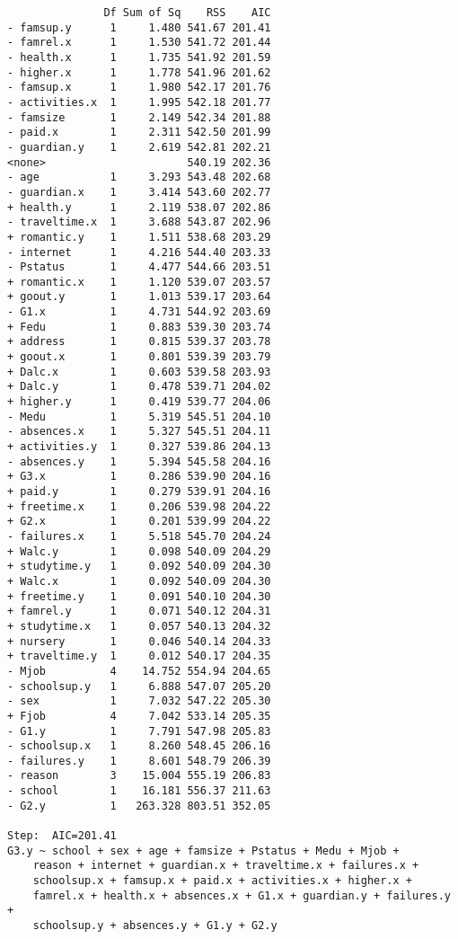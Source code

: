 \documentclass[11pt]{article}
\begin{document}
\begin{enumerate}
\begin{verbatim}
               Df Sum of Sq    RSS    AIC
- famsup.y      1     1.480 541.67 201.41
- famrel.x      1     1.530 541.72 201.44
- health.x      1     1.735 541.92 201.59
- higher.x      1     1.778 541.96 201.62
- famsup.x      1     1.980 542.17 201.76
- activities.x  1     1.995 542.18 201.77
- famsize       1     2.149 542.34 201.88
- paid.x        1     2.311 542.50 201.99
- guardian.y    1     2.619 542.81 202.21
<none>                      540.19 202.36
- age           1     3.293 543.48 202.68
- guardian.x    1     3.414 543.60 202.77
+ health.y      1     2.119 538.07 202.86
- traveltime.x  1     3.688 543.87 202.96
+ romantic.y    1     1.511 538.68 203.29
- internet      1     4.216 544.40 203.33
- Pstatus       1     4.477 544.66 203.51
+ romantic.x    1     1.120 539.07 203.57
+ goout.y       1     1.013 539.17 203.64
- G1.x          1     4.731 544.92 203.69
+ Fedu          1     0.883 539.30 203.74
+ address       1     0.815 539.37 203.78
+ goout.x       1     0.801 539.39 203.79
+ Dalc.x        1     0.603 539.58 203.93
+ Dalc.y        1     0.478 539.71 204.02
+ higher.y      1     0.419 539.77 204.06
- Medu          1     5.319 545.51 204.10
- absences.x    1     5.327 545.51 204.11
+ activities.y  1     0.327 539.86 204.13
- absences.y    1     5.394 545.58 204.16
+ G3.x          1     0.286 539.90 204.16
+ paid.y        1     0.279 539.91 204.16
+ freetime.x    1     0.206 539.98 204.22
+ G2.x          1     0.201 539.99 204.22
- failures.x    1     5.518 545.70 204.24
+ Walc.y        1     0.098 540.09 204.29
+ studytime.y   1     0.092 540.09 204.30
+ Walc.x        1     0.092 540.09 204.30
+ freetime.y    1     0.091 540.10 204.30
+ famrel.y      1     0.071 540.12 204.31
+ studytime.x   1     0.057 540.13 204.32
+ nursery       1     0.046 540.14 204.33
+ traveltime.y  1     0.012 540.17 204.35
- Mjob          4    14.752 554.94 204.65
- schoolsup.y   1     6.888 547.07 205.20
- sex           1     7.032 547.22 205.30
+ Fjob          4     7.042 533.14 205.35
- G1.y          1     7.791 547.98 205.83
- schoolsup.x   1     8.260 548.45 206.16
- failures.y    1     8.601 548.79 206.39
- reason        3    15.004 555.19 206.83
- school        1    16.181 556.37 211.63
- G2.y          1   263.328 803.51 352.05

Step:  AIC=201.41
G3.y ~ school + sex + age + famsize + Pstatus + Medu + Mjob + 
    reason + internet + guardian.x + traveltime.x + failures.x + 
    schoolsup.x + famsup.x + paid.x + activities.x + higher.x + 
    famrel.x + health.x + absences.x + G1.x + guardian.y + failures.y + 
    schoolsup.y + absences.y + G1.y + G2.y


\end{verbatim}
\end{enumerate}
\end{document}
